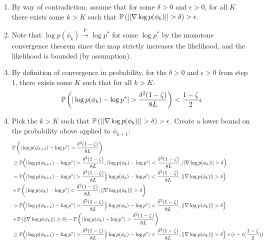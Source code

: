 \begin{enumerate}
    \item By way of contradiction, assume that for some $\delta > 0$ and $\epsilon > 0$, for all $K$ there exists some $k > K$ such that $\mathbb{P} \left(||\nabla \log p(\phi_k)|| > \delta \right) > \epsilon$.
    \item Note that $\log p(\phi_k)\overset{p}{\to} \log p^*$ for some $\log p^*$ by the monotone convergence theorem since the map strictly increases the likelihood, and the likelihood is bounded (by assumption).
    \item By definition of convergence in probability, for the $\delta > 0$ and $\epsilon > 0$ from step 1, there exists some $K$ such that for all $k > K$:
    $$\mathbb{P}\left(|\log p(\phi_{k}) - \log p^*| > \frac{\delta^2(1-\zeta)}{8L}\right) < \frac{1-\zeta}{2}\epsilon$$
    \item Pick the $k > K$ such that $\mathbb{P} \left(||\nabla \log p(\phi_k)|| > \delta \right) > \epsilon$. Create a lower bound on the probability above applied to $\phi_{k+1}$:
    \begin{align*}
        &\bbP\left(|\log p(\phi_{k+1}) - \log p^*| > \frac{\delta^2(1-\zeta)}{8L}\right) \\ 
        &\geq \bbP\Big(|\log p(\phi_{k+1}) - \log p^*| > \frac{\delta^2(1-\zeta)}{8L}, |\log p(\phi_k) - \log p^*| < \frac{\delta^2(1-\zeta)}{8L}, ||\nabla \log p(\phi_k)|| > \delta \Big) \\
        &= \bbP\Big(|\log p(\phi_{k+1}) - \log p^*| > \frac{\delta^2(1-\zeta)}{8L} \Big| |\log p(\phi_k) - \log p^*| < \frac{\delta^2(1-\zeta)}{8L}, ||\nabla \log p(\phi_k)|| > \delta \Big) \\
        & * \bbP\left( |\log p(\phi_k) - \log p^*| < \frac{\delta^2(1-\zeta)}{8L}, ||\nabla \log p(\phi_k)|| > \delta \right) \\ 
        & > \bbP\Big(|\log p(\phi_{k+1}) - \log p^*| > \frac{\delta^2(1-\zeta)}{8L} \Big| |\log p(\phi_k) - \log p^*| < \frac{\delta^2(1-\zeta)}{8L}, ||\nabla \log p(\phi_k)|| > \delta \Big) \\
        & * \bbP \left(||\nabla \log p(\phi_k)|| \geq \delta \right) - \bbP\left( |\log p(\phi_k) - \log p^*| > \frac{\delta^2(1-\zeta)}{8L}\right) \\
        & \geq \bbP\Big(|\log p(\phi_{k+1}) - \log p^*| > \frac{\delta^2(1-\zeta)}{8L} \Big| |\log p(\phi_k) - \log p^*| < \frac{\delta^2(1-\zeta)}{8L}, ||\nabla \log p(\phi_k)|| > \delta \Big) * (\epsilon - \epsilon(\frac{1-\zeta}{2})) \\

\end{align*}
\end{enumerate}
